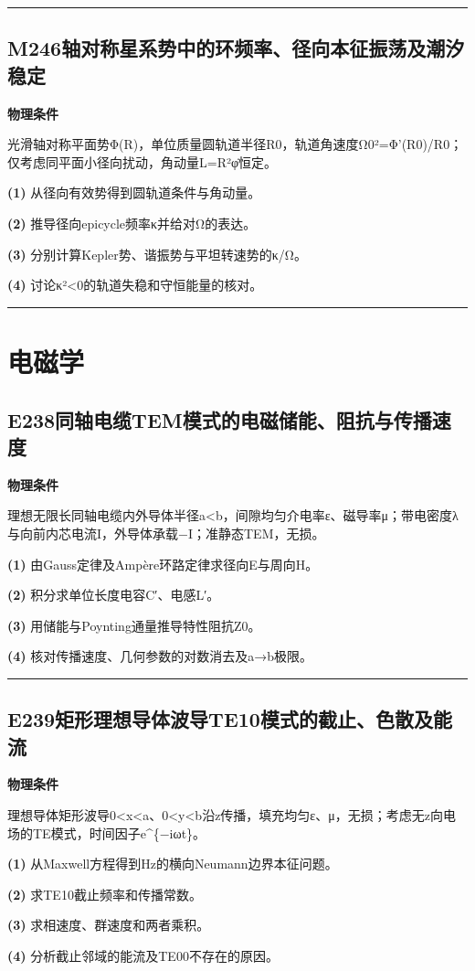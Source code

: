 \documentclass[UTF8,a4paper,11pt,oneside,openany]{ctexbook}
\begin{document}
\par\bigskip\hrule\bigskip
\section*{M246\quad 轴对称星系势中的环频率、径向本征振荡及潮汐稳定}
\textbf{物理条件}\par 光滑轴对称平面势Φ(R)，单位质量圆轨道半径R0，轨道角速度Ω0²=Φ'(R0)/R0；仅考虑同平面小径向扰动，角动量L=R²φ̇恒定。
\par\noindent\textbf{(1)} 从径向有效势得到圆轨道条件与角动量。
\par\noindent\textbf{(2)} 推导径向epicycle频率κ并给对Ω的表达。
\par\noindent\textbf{(3)} 分别计算Kepler势、谐振势与平坦转速势的κ/Ω。
\par\noindent\textbf{(4)} 讨论κ²<0的轨道失稳和守恒能量的核对。

\par\bigskip\hrule\bigskip
\chapter{电磁学}
\section*{E238\quad 同轴电缆TEM模式的电磁储能、阻抗与传播速度}
\textbf{物理条件}\par 理想无限长同轴电缆内外导体半径a<b，间隙均匀介电率ε、磁导率μ；带电密度λ与向前内芯电流I，外导体承载−I；准静态TEM，无损。
\par\noindent\textbf{(1)} 由Gauss定律及Ampère环路定律求径向E与周向H。
\par\noindent\textbf{(2)} 积分求单位长度电容C′、电感L′。
\par\noindent\textbf{(3)} 用储能与Poynting通量推导特性阻抗Z0。
\par\noindent\textbf{(4)} 核对传播速度、几何参数的对数消去及a→b极限。

\par\bigskip\hrule\bigskip
\section*{E239\quad 矩形理想导体波导TE10模式的截止、色散及能流}
\textbf{物理条件}\par 理想导体矩形波导0<x<a、0<y<b沿z传播，填充均匀ε、μ，无损；考虑无z向电场的TE模式，时间因子e\textasciicircum{}\{−iωt\}。
\par\noindent\textbf{(1)} 从Maxwell方程得到Hz的横向Neumann边界本征问题。
\par\noindent\textbf{(2)} 求TE10截止频率和传播常数。
\par\noindent\textbf{(3)} 求相速度、群速度和两者乘积。
\par\noindent\textbf{(4)} 分析截止邻域的能流及TE00不存在的原因。
\end{document}

